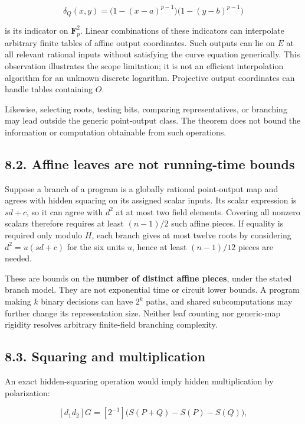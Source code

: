 \documentclass[
  11pt,
  a4paper,
]{article}
\begin{document}
\[
\delta_Q(x,y)=\bigl(1-(x-a)^{p-1}\bigr)\bigl(1-(y-b)^{p-1}\bigr)
\]

is its indicator on \(\mathbf F_p^2\). Linear combinations of these
indicators can interpolate arbitrary finite tables of affine output
coordinates. Such outputs can lie on \(E\) at all relevant rational
inputs without satisfying the curve equation generically. This
observation illustrates the scope limitation; it is not an efficient
interpolation algorithm for an unknown discrete logarithm. Projective
output coordinates can handle tables containing \(O\).

Likewise, selecting roots, testing bits, comparing representatives, or
branching may lead outside the generic point-output class. The theorem
does not bound the information or computation obtainable from such
operations.

\subsection{8.2. Affine leaves are not running-time
bounds}\label{affine-leaves-are-not-running-time-bounds}

Suppose a branch of a program is a globally rational point-output map
and agrees with hidden squaring on its assigned scalar inputs. Its
scalar expression is \(sd+c\), so it can agree with \(d^2\) at at most
two field elements. Covering all nonzero scalars therefore requires at
least \((n-1)/2\) such affine pieces. If equality is required only
modulo \(H\), each branch gives at most twelve roots by considering
\(d^2=u(sd+c)\) for the six units \(u\), hence at least \((n-1)/12\)
pieces are needed.

These are bounds on the \textbf{number of distinct affine pieces}, under
the stated branch model. They are not exponential time or circuit lower
bounds. A program making \(k\) binary decisions can have \(2^k\) paths,
and shared subcomputations may further change its representation size.
Neither leaf counting nor generic-map rigidity resolves arbitrary
finite-field branching complexity.

\subsection{8.3. Squaring and
multiplication}\label{squaring-and-multiplication}

An exact hidden-squaring operation would imply hidden multiplication by
polarization:

\[
[d_1d_2]G=[2^{-1}]\bigl(S(P+Q)-S(P)-S(Q)\bigr),
\]
\end{document}
